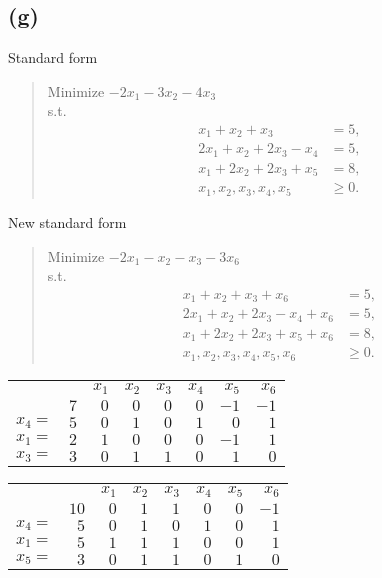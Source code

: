 \documentclass{article}
\theoremstyle{definition}
\begin{document}
\subsection*{(g)}
Standard form
\begin{quote}
  Minimize $-2x_1-3x_2-4x_3$ \\
  s.t.
  \begin{align*}
    x_1+x_2+x_3 &= 5, \\
    2x_1+x_2+2x_3-x_4 &= 5, \\
    x_1+2x_2+2x_3+x_5 &= 8, \\
    x_1, x_2, x_3, x_4, x_5 &\geq 0.
  \end{align*}
\end{quote}
New standard form
\begin{quote}
  Minimize $-2x_1-x_2-x_3-3x_6$ \\
  s.t.
  \begin{align*}
    x_1+x_2+x_3+x_6 &= 5, \\
    2x_1+x_2+2x_3-x_4+x_6 &= 5, \\
    x_1+2x_2+2x_3+x_5+x_6 &= 8, \\
    x_1, x_2, x_3, x_4, x_5, x_6 &\geq 0.
  \end{align*}
\end{quote}
\bgroup
\def\arraystretch{1.5}
\begin{table}[H]
  \begin{tabular}{r|r|rrrrrr|}
  \cline{2-8}
    &   & $x_1$ & $x_2$ & $x_3$ & $x_4$ & $x_5$ & $x_6$ \\ \cline{2-8}
    & $7$ & $0$ & $0$ & $0$ & $0$ & $-1$ & $-1$ \\ \cline{2-8}
  $x_4 = $ & $5$ & $0$ & $1$ & $0$ & $1$ & $0$ & $1$ \\ 
  $x_1 = $ & $2$ & $1$ & $0$ & $0$ & $0$ & $-1$ & $1$ \\ 
  $x_3 = $ & $3$ & $0$ & $1$ & $1$ & $0$ & $1$ & $0$ \\ \cline{2-8}
  \end{tabular}
\end{table}
\egroup
\bgroup
\def\arraystretch{1.5}
\begin{table}[H]
  \begin{tabular}{r|r|rrrrrr|}
  \cline{2-8}
    &   & $x_1$ & $x_2$ & $x_3$ & $x_4$ & $x_5$ & $x_6$ \\ \cline{2-8}
    & $10$ & $0$ & $1$ & $1$ & $0$ & $0$ & $-1$ \\ \cline{2-8}
  $x_4 = $ & $5$ & $0$ & $1$ & $0$ & $1$ & $0$ & $1$ \\ 
  $x_1 = $ & $5$ & $1$ & $1$ & $1$ & $0$ & $0$ & $1$ \\ 
  $x_5 = $ & $3$ & $0$ & $1$ & $1$ & $0$ & $1$ & $0$ \\ \cline{2-8}
  \end{tabular}
\end{table}
\end{document}
